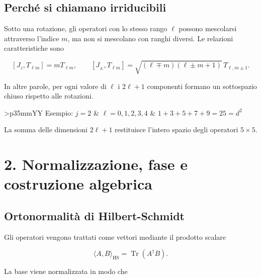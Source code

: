 \documentclass[10pt,a4paper]{article}
\newcommand{\HS}{\mathrm{HS}}
\begin{document}
\subsection{Perch\'e si chiamano irriducibili}

Sotto una rotazione, gli operatori con lo stesso rango $\ell$ possono
mescolarsi attraverso l'indice $m$, ma non si mescolano con ranghi diversi.
Le relazioni caratteristiche sono

\begin{equationbox}
\[
 [J_z,T_{\ell m}]=mT_{\ell m},
 \qquad
 [J_{\pm},T_{\ell m}]
 =\sqrt{(\ell\mp m)(\ell\pm m+1)}\,T_{\ell,m\pm1}.
\]
\end{equationbox}

In altre parole, per ogni valore di $\ell$ i $2\ell+1$ componenti formano un
sottospazio chiuso rispetto alle rotazioni.

\begin{notebox}[colback=PaleTeal,colframe=Teal]
  \begin{tabularx}{\linewidth}{>{\bfseries}p{35mm}YY}
    Esempio: $j=2$ & $\ell=0,1,2,3,4$ &
    $1+3+5+7+9=25=d^2$
  \end{tabularx}
\end{notebox}

La somma delle dimensioni $2\ell+1$ restituisce l'intero spazio degli
operatori $5\times5$.

\newpage

\section*{2. Normalizzazione, fase e costruzione algebrica}

\subsection{Ortonormalit\`a di Hilbert-Schmidt}

Gli operatori vengono trattati come vettori mediante il prodotto scalare

\begin{equationbox}
\[
  \langle A,B\rangle_{\HS}=\operatorname{Tr}(A^{\dagger}B).
\]
\end{equationbox}

La base viene normalizzata in modo che
\end{document}

